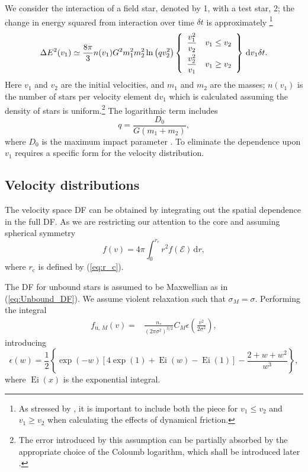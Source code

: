 \documentclass[useAMS,usedcolumn,usegraphicx,usenatbib]{mn2e}
\newcommand{\eqnref}[1]{(\ref{eq:#1})}
\DeclareMathOperator{\Ei}{Ei}
\newcommand{\sub}[1]{\ensuremath{_\mathrm{#1}}}
\newcommand{\dd}{\ensuremath{\mathrm{d}}}
\newcommand{\intd}[4]{\ensuremath{\displaystyle \int_{#1}^{#2}{#3}\,\dd{#4}}}
\newcommand{\recip}[1]{\ensuremath{\dfrac{1}{#1}}}
\begin{document}
\begin{onecolumn}
We consider the interaction of a field star, denoted by 1, with a test star, 2; the change in energy squared from interaction over time $\delta t$ is approximately \citep[chapter 2]{Chandrasekhar1960}\footnote{As stressed by \citet{Antonini2011}, it is important to include both the piece for $v_1 \leq v_2$ and $v_1 \geq v_2$ when calculating the effects of dynamical friction.}
\begin{equation}
\Delta E^2(v_1) \simeq \frac{8\pi}{3} n(v_1)G^2m_1^2 m_2^2\ln\left(qv_2^2\right)\left\{\begin{array}{lr}\dfrac{v_1^2}{v_2}\vspace{1.0mm} & v_1 \leq v_2\\ \dfrac{v_2^2}{v_1} & v_1 \geq v_2 \end{array}\right\}\,\dd v_1\delta t.
\end{equation}
Here $v_1$ and $v_2$ are the initial velocities, and $m_1$ and $m_2$ are the masses; $n(v_1)$ is the number of stars per velocity element $\dd v_1$ which is calculated assuming the density of stars is uniform.\footnote{The error introduced by this assumption can be partially absorbed by the appropriate choice of the Coloumb logarithm, which shall be introduced later \citep{Just2011}.} The logarithmic term includes
\begin{equation}
q = \frac{D_0}{G\left(m_1+m_2\right)},
\end{equation}
where $D_0$ is the maximum impact parameter \citep{Weinberg1986}. To eliminate the dependence upon $v_1$ requires a specific form for the velocity distribution.

\subsection{Velocity distributions}

The velocity space DF can be obtained by integrating out the spatial dependence in the full DF. As we are restricting our attention to the core and assuming spherical symmetry
\begin{equation}
f(v) = 4\pi\intd{0}{r\sub{c}}{r^2f(\mathcal{E})}{r},
\end{equation}
where $r\sub{c}$ is defined by \eqnref{r_c}.

The DF for unbound stars is assumed to be Maxwellian as in \eqnref{Unbound_DF}. We assume violent relaxation such that $\sigma_M = \sigma$. Performing the integral
\begin{align}
f_{\mathrm{u},\,M}(v) = {} & \frac{n_\ast}{\left(2\pi\sigma^2\right)^{3/2}}C_M\epsilon\left(\frac{v^2}{2\sigma^2}\right),
\end{align}
introducing
\begin{equation}
\epsilon(w) = \recip{2}\left\{\exp(-w)\left[4\exp(1) + \Ei(w) - \Ei(1)\right] - \frac{2 + w + w^2}{w^3}\right\},
\end{equation}
where $\Ei(x)$ is the exponential integral.


\end{onecolumn}
\end{document}

